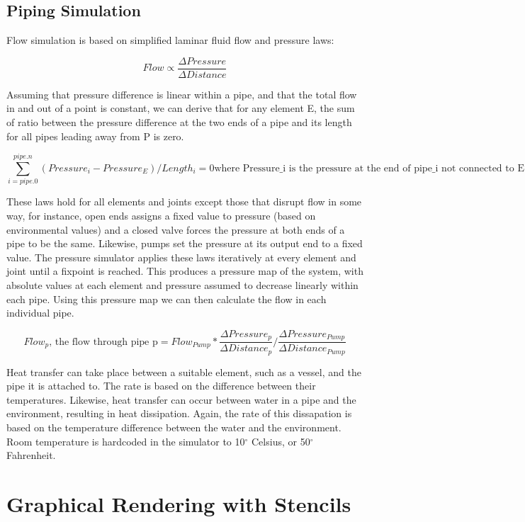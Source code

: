 \documentclass[11pt]{article}
\begin{document}
\subsection{Piping Simulation}

Flow simulation is based on simplified laminar fluid flow and pressure laws:

\[
Flow \propto \frac{\Delta Pressure}{\Delta Distance}
\]

Assuming that pressure difference is linear within a pipe, and that the total flow in and out of a point is constant, we can derive that for any element E, the sum of ratio between the pressure difference at the two ends of a pipe and its length for all pipes leading away from P is zero. 

\[
\sum_{i=pipe.0}^{pipe.n}{ (Pressure_{i}-Pressure_{E}) / Length_{i} } = 0 
\textrm{where Pressure_{i} is the pressure at the end of pipe_{i} not connected to E}
\]

These laws hold for all elements and joints except those that disrupt flow in some way, for instance, open ends assigns a fixed value to pressure (based on environmental values) and a closed valve forces the pressure at both ends of a pipe to be the same. Likewise, pumps set the pressure at its output end to a fixed value. The pressure simulator applies these laws iteratively at every element and joint until a fixpoint is reached. This produces a pressure map of the system, with absolute values at each element and pressure assumed to decrease linearly within each pipe. Using this pressure map we can then calculate the flow in each individual pipe.

\[
Flow_{p}\textrm{, the flow through pipe p} = Flow_{Pump} * \frac{\Delta Pressure_{p}}{\Delta Distance_{p}} / \frac{\Delta Pressure_{Pump}}{\Delta Distance_{Pump}}
\]

Heat transfer can take place between a suitable element, such as a vessel, and the pipe it is attached to. The rate is based on the difference between their temperatures. Likewise, heat transfer can occur between water in a pipe and the environment, resulting in heat dissipation. Again, the rate of this dissapation is based on the temperature difference between the water and the environment. Room temperature is hardcoded in the simulator to 10$^\circ$ Celsius, or 50$^\circ$ Fahrenheit.

\section{Graphical Rendering with Stencils}
\end{document}
